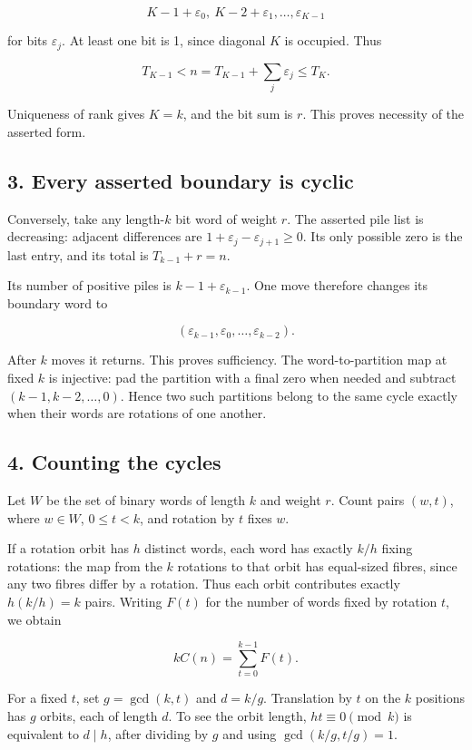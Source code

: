 \documentclass[11pt,a4paper]{article}
\begin{document}
\[
K-1+\varepsilon_0,\ K-2+\varepsilon_1,\ldots,\varepsilon_{K-1}
\]

for bits \(\varepsilon_j\). At least one bit is 1, since diagonal \(K\) is occupied. Thus

\[
T_{K-1}<n=T_{K-1}+\sum_j\varepsilon_j\le T_K.
\]

Uniqueness of rank gives \(K=k\), and the bit sum is \(r\). This proves necessity of the asserted form.

\subsection{3. Every asserted boundary is cyclic}\label{every-asserted-boundary-is-cyclic}

Conversely, take any length-\(k\) bit word of weight \(r\). The asserted pile list is decreasing: adjacent differences are \(1+\varepsilon_j-\varepsilon_{j+1}\ge0\). Its only possible zero is the last entry, and its total is \(T_{k-1}+r=n\).

Its number of positive piles is \(k-1+\varepsilon_{k-1}\). One move therefore changes its boundary word to

\[
(\varepsilon_{k-1},\varepsilon_0,\ldots,\varepsilon_{k-2}).
\]

After \(k\) moves it returns. This proves sufficiency. The word-to-partition map at fixed \(k\) is injective: pad the partition with a final zero when needed and subtract \((k-1,k-2,\ldots,0)\). Hence two such partitions belong to the same cycle exactly when their words are rotations of one another.

\subsection{4. Counting the cycles}\label{counting-the-cycles}

Let \(W\) be the set of binary words of length \(k\) and weight \(r\). Count pairs \((w,t)\), where \(w\in W\), \(0\le t<k\), and rotation by \(t\) fixes \(w\).

If a rotation orbit has \(h\) distinct words, each word has exactly \(k/h\) fixing rotations: the map from the \(k\) rotations to that orbit has equal-sized fibres, since any two fibres differ by a rotation. Thus each orbit contributes exactly \(h(k/h)=k\) pairs. Writing \(F(t)\) for the number of words fixed by rotation \(t\), we obtain

\[
kC(n)=\sum_{t=0}^{k-1}F(t).
\]

For a fixed \(t\), set \(g=\gcd(k,t)\) and \(d=k/g\). Translation by \(t\) on the \(k\) positions has \(g\) orbits, each of length \(d\). To see the orbit length, \(ht\equiv0\pmod k\) is equivalent to \(d\mid h\), after dividing by \(g\) and using \(\gcd(k/g,t/g)=1\).
\end{document}
